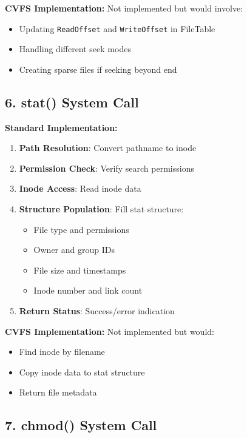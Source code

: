 \documentclass[11pt,a4paper]{article}
\begin{document}
\textbf{CVFS Implementation:}
Not implemented but would involve:
\begin{itemize}
    \item Updating \texttt{ReadOffset} and \texttt{WriteOffset} in FileTable
    \item Handling different seek modes
    \item Creating sparse files if seeking beyond end
\end{itemize}

\subsection{6. stat() System Call}

\textbf{Standard Implementation:}
\begin{enumerate}
    \item \textbf{Path Resolution}: Convert pathname to inode
    \item \textbf{Permission Check}: Verify search permissions
    \item \textbf{Inode Access}: Read inode data
    \item \textbf{Structure Population}: Fill stat structure:
    \begin{itemize}
        \item File type and permissions
        \item Owner and group IDs
        \item File size and timestamps
        \item Inode number and link count
    \end{itemize}
    \item \textbf{Return Status}: Success/error indication
\end{enumerate}

\textbf{CVFS Implementation:}
Not implemented but would:
\begin{itemize}
    \item Find inode by filename
    \item Copy inode data to stat structure
    \item Return file metadata
\end{itemize}

\subsection{7. chmod() System Call}
\end{document}
